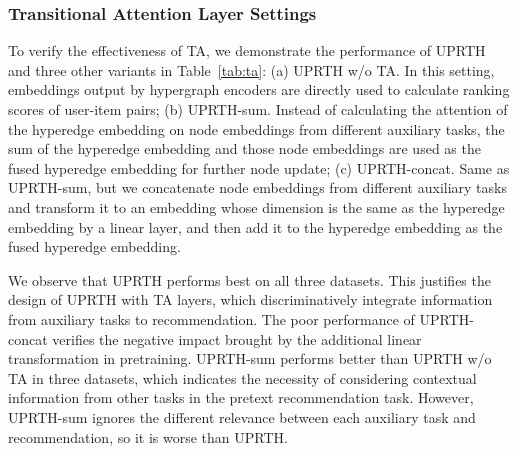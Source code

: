 \subsubsection{Transitional Attention Layer Settings}
To verify the effectiveness of TA, we demonstrate the performance of UPRTH and three other variants in Table~\ref{tab:ta}: (a) UPRTH w/o TA. In this setting, embeddings output by hypergraph encoders are directly used to calculate ranking scores of user-item pairs; (b) UPRTH-sum. Instead of calculating the attention of the hyperedge embedding on node embeddings from different auxiliary tasks, the sum of the hyperedge embedding and those node embeddings are used as the fused hyperedge embedding for further node update; (c) UPRTH-concat. Same as UPRTH-sum, but we concatenate node embeddings from different auxiliary tasks and transform it to an embedding whose dimension is the same as the hyperedge embedding by a linear layer, and then add it to the hyperedge embedding as the fused hyperedge embedding.

We observe that UPRTH performs best on all three datasets. This justifies the design of UPRTH with TA layers, which discriminatively integrate information from auxiliary tasks to recommendation. The poor performance of UPRTH-concat verifies the negative impact brought by the additional linear transformation in pretraining. UPRTH-sum performs better than UPRTH w/o TA in three datasets, which indicates the necessity of considering contextual information from other tasks in the pretext recommendation task. However, UPRTH-sum ignores the different relevance between each auxiliary task and recommendation, so it is worse than UPRTH.
\begin{table}[ht]
\caption{Ablation study on the proposed TA Layer in UPRTH.}\label{tab:ta}
\end{table}


